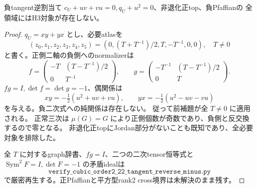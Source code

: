 \begin{theorem}\label{thm:h3-order2-22-tangent-reverse-minus-empty}
負tangent逆割当て $c_U+uv+vu=0,q_U+u^2=0$、非退化正top、負Pfaffianの
全領域にはH3対象が存在しない。
\end{theorem}
\begin{proof}
$q_U=xy+yx$ とし、必要atlasを
\[
 (z_0,z_1,z_2,z_3,z_4,z_5)
 =(0,(T+T^{-1})/2,T,-T^{-1},0,0),\quad T\ne0
\]
と書く。正側二軸の負側へのnormalizerは
\[
 f=\begin{pmatrix}-T&(T-T^{-1})/2\\0&T^{-1}\end{pmatrix},\qquad
 g=\begin{pmatrix}-T^{-1}&(T-T^{-1})/2\\0&T\end{pmatrix}.
\]
$fg=I,\det f=\det g=-1$、偶関係は
\[
 xy=-\tfrac12(u^2+uv+vu),\qquad
 yx=-\tfrac12(u^2-uv-vu)
\]
を与える。負二次式への純関係は存在しない。
従って前補題が全 $T\ne0$ に適用される。
正常三次は $\mu(G)=G$ により正側個数が奇数であり、負側と反交換するので零となる。
非退化正topにJordan部分がないことも既知であり、全必要対象を排除した。

全 $T$ に対するgraph辞書、$fg=I$、二つの二次tensor恒等式と
$\operatorname{Sym}^2F=I,\det F=-1$ の矛盾idealは
\[
\texttt{verify\_cubic\_order2\_22\_tangent\_reverse\_minus.py}
\]
で厳密再生する。正Pfaffianと平方型rank2 cross境界は未解決のまま残す。
\end{proof}
